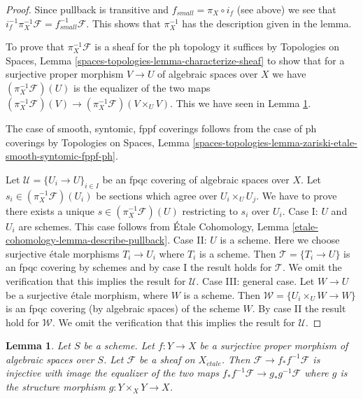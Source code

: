 \documentclass{stacks-project}
\theoremstyle{plain}
\newtheorem{lemma}[subsection]{Lemma}
\theoremstyle{definition}
\theoremstyle{remark}
\numberwithin{equation}{subsection}
\def\etale{{\acute{e}tale}}
\begin{document}
\begin{proof}
Since pullback is transitive and $f_{small} = \pi_X \circ i_f$
(see above) we see that
$i_f^{-1} \pi_X^{-1}\mathcal{F} = f_{small}^{-1}\mathcal{F}$.
This shows that $\pi_X^{-1}$ has the description given in the lemma.

\medskip\noindent
To prove that $\pi_X^{-1}\mathcal{F}$ is a sheaf for the ph topology
it suffices by Topologies on Spaces, Lemma
\ref{spaces-topologies-lemma-characterize-sheaf}
to show that for a surjective proper morphism
$V \to U$ of algebraic spaces over $X$ we have
$(\pi_X^{-1}\mathcal{F})(U)$ is the equalizer of the two maps
$(\pi_X^{-1}\mathcal{F})(V) \to (\pi_X^{-1}\mathcal{F})(V \times_U V)$.
This we have seen in Lemma \ref{lemma-surjective-proper}.

\medskip\noindent
The case of smooth, syntomic, fppf coverings follows from the case
of ph coverings by Topologies on Spaces, Lemma
\ref{spaces-topologies-lemma-zariski-etale-smooth-syntomic-fppf-ph}.

\medskip\noindent
Let $\mathcal{U} = \{U_i \to U\}_{i \in I}$ be an fpqc covering of algebraic
spaces over $X$. Let $s_i \in (\pi_X^{-1}\mathcal{F})(U_i)$ be sections
which agree over $U_i \times_U U_j$. We have to prove there exists a unique
$s \in (\pi_X^{-1}\mathcal{F})(U)$ restricting to $s_i$ over $U_i$.
Case I: $U$ and $U_i$ are schemes. This case follows from
\'Etale Cohomology, Lemma \ref{etale-cohomology-lemma-describe-pullback}.
Case II: $U$ is a scheme. Here we choose surjective \'etale morphisms
$T_i \to U_i$ where $T_i$ is a scheme. Then $\mathcal{T} = \{T_i \to U\}$ is an
fpqc covering by schemes and by case I the result holds for $\mathcal{T}$.
We omit the verification that this implies the result for $\mathcal{U}$.
Case III: general case. Let $W \to U$ be a surjective \'etale
morphism, where $W$ is a scheme. Then $\mathcal{W} = \{U_i \times_U W \to W\}$
is an fpqc covering (by algebraic spaces) of the scheme $W$.
By case II the result hold for $\mathcal{W}$.
We omit the verification that this implies the result for $\mathcal{U}$.
\end{proof}

\begin{lemma}
\label{lemma-surjective-proper}
Let $S$ be a scheme. Let $f : Y \to X$ be a surjective proper morphism
of algebraic spaces over $S$. Let $\mathcal{F}$ be a sheaf on $X_\etale$.
Then $\mathcal{F} \to f_*f^{-1}\mathcal{F}$ is injective with
image the equalizer of the two maps
$f_*f^{-1}\mathcal{F} \to g_*g^{-1}\mathcal{F}$ where
$g$ is the structure morphism $g : Y \times_X Y \to X$.
\end{lemma}
\end{document}
